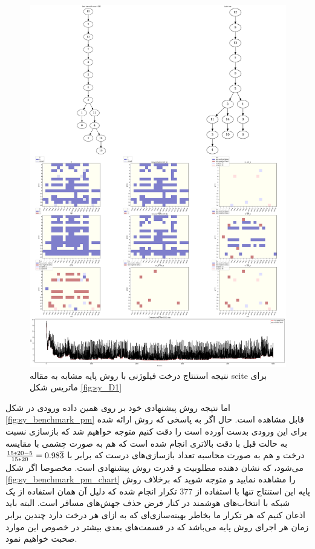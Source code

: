 \begin{figure}[!ht]
	\centering
	\includegraphics[height=0.9\textheight]{img/chaps/er/SCITE_s_tree}
	\caption{‌نتیجه استنتاج درخت فیلوژنی با روش پایه مشابه به مقاله scite برای ماتریس شکل \ref*{fig:sy_D1}}
	\label{fig:sy_benchmark1}
\end{figure}

اما نتیجه روش پیشنهادی خود بر روی همین داده ورودی در شکل \ref{fig:sy_benchmark_pm} قابل مشاهده است. حال اگر به پاسخی که روش ارائه شده برای این ورودی بدست آورده است را دقت کنیم متوجه خواهیم شد که بازسازی نسبت به حالت قبل با دقت بالاتری انجام شده است که هم به صورت چشمی با مقایسه درخت و هم به صورت محاسبه تعداد بازسازی‌های درست که برابر با 
${15*20 - 5\over15*20} = 0.98\overline{3}$
می‌شود، که نشان دهنده مطلوبیت و قدرت روش پیشنهادی است. مخصوصا اگر شکل \ref{fig:sy_benchmark_pm_chart} را مشاهده نمایید و متوجه شوید که برخلاف روش پایه این استنتاج تنها با استفاده از $377$ تکرار انجام شده که دلیل آن همان استفاده از یک شبکه با انتخاب‌های هوشمند در کنار فرض حذف جهش‌های مسافر است. البته باید اذعان کنیم که هر تکرار ما بخاطر بهینه‌سازی‌ای که به ازای هر درخت دارد چندین برابر زمان هر اجرای روش پایه می‌باشد که در قسمت‌های بعدی بیشتر در خصوص این موارد صحبت خواهیم نمود.

